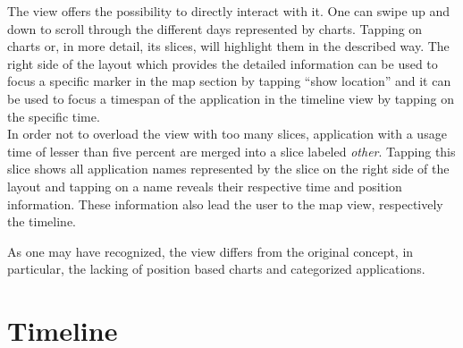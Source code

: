 The  view offers the possibility to directly interact with it. One can swipe up and down to scroll through the different days represented by charts. Tapping on charts or, in more detail, its slices, will highlight them in the described way. The right side of the layout which provides the detailed information can be used to focus a specific marker in the map section by tapping ``show location'' and it can be used to focus a timespan of the application in the timeline view by tapping on the specific time.\\
In order not to overload the view with too many slices, application with a usage time of lesser than five percent are merged into a slice labeled \emph{other}. Tapping this slice shows all application names represented by the slice on the right side of the layout and tapping on a name reveals their respective time and position information. These information also lead the user to the map view, respectively the timeline.

As  one may have recognized, the view differs from the original concept, in particular, the lacking of position based charts and categorized applications. 
\newpage
\section{Timeline}

